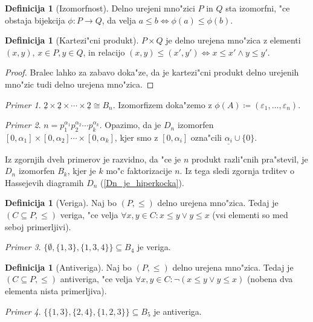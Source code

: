 \documentclass[a4paper,12pt]{article}
\theoremstyle{definition}
\newtheorem{defn}[counter]{Definicija}
\theoremstyle{remark}
\newtheorem*{ex}{Primer}
\begin{document}
\begin{defn}[Izomorfnost]
	Delno urejeni mno"zici $P$ in $Q$ sta izomorfni, "ce obstaja bijekcija $\phi: P \rightarrow Q$, da velja $a \leqslant b \iff \phi(a) \leqslant \phi(b)$.
\end{defn}
\begin{defn}[Kartezi"cni produkt]
	$P \times Q$ je delno urejena mno"zica z elementi $(x, y)$, $x \in P, y \in Q$, in relacijo $(x, y) \leqslant (x', y') \iff x \leqslant x' \land y \leqslant y'$.
\end{defn}
\begin{proof}
	Bralec lahko za zabavo doka"ze, da je kartezi"cni produkt delno urejenih mno"zic tudi delno urejena mno"zica.
\end{proof}

\begin{ex}
	$\underline{2} \times \underline{2} \times \cdots \times \underline{2} \cong B_n$. Izomorfizem doka"zemo z $\phi(A) \coloneqq (\varepsilon_1, \ldots, \varepsilon_n)$.
\end{ex}
\begin{ex}
	$n = p_1^{\alpha_1}p_2^{\alpha_2}\cdots p_k^{\alpha_k}$. Opazimo, da je $D_n$ izomorfen
	$[0, \alpha_1] \times [0, \alpha_2] \cdots \times [0,\alpha_k]$, kjer smo z $[0, \alpha_i]$ ozna"cili $\underline{\alpha_i} \cup \{0\}$.
\end{ex}
Iz zgornjih dveh primerov je razvidno, da "ce je $n$ produkt razli"cnih pra"stevil, je $D_n$ izomorfen $B_k$, kjer je $k$ mo"c faktorizacije $n$. Iz tega sledi zgornja trditev o Hassejevih diagramih $D_n$ (\ref{Dn_je_hiperkocka}).

\begin{defn}[Veriga]
	Naj bo $(P, \leqslant)$ delno urejena mno"zica. Tedaj je $(C \subseteq P, \leqslant)$ veriga, "ce velja $\forall x,y\in C: x \leq y \lor y \leq x$ (vsi elementi so med seboj primerljivi).
\end{defn}
\begin{ex}
	$\{ \emptyset, \{1, 3\}, \{1, 3, 4\}\} \subseteq B_4$ je veriga.
\end{ex}
\begin{defn}[Antiveriga]
	Naj bo $(P, \leqslant)$ delno urejena mno"zica. Tedaj je $(C \subseteq P, \leqslant)$ antiveriga, "ce velja $\forall x,y\in C: \lnot(x \leq y \lor y \leq x)$ (nobena dva elementa nista primerljiva).
\end{defn}
\begin{ex}
	$\{\{1, 3\}, \{2, 4\}, \{1, 2, 3\}\} \subseteq B_5$ je antiveriga.
\end{ex}
\end{document}
